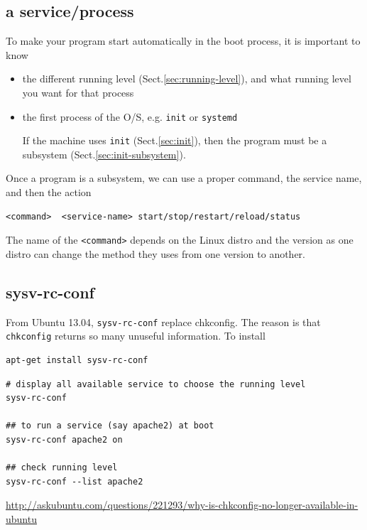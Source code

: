 \subsection{a service/process}
\label{sec:auto-run-service}

To make your program start automatically in the boot process, it is important to 
know
\begin{itemize}
  \item the different running level (Sect.\ref{sec:running-level}), and what
  running level you want for that process
  
  \item the first process of the O/S, e.g. \verb!init! or \verb!systemd!
  
  If the machine uses \verb!init! (Sect.\ref{sec:init}), then the program must
  be a subsystem (Sect.\ref{sec:init-subsystem}).
  
  
\end{itemize}


Once a program is a subsystem, we can use a proper command, the service name,
and then the action
\begin{verbatim}
<command>  <service-name> start/stop/restart/reload/status
\end{verbatim}
The name of the \verb!<command>! depends on the Linux distro and the version as
one distro can change the method they uses from one version to another.






\subsection{sysv-rc-conf}
\label{sec:sysv-rc-conf} 

From Ubuntu 13.04, \verb!sysv-rc-conf! replace chkconfig. The reason is that
\verb!chkconfig! returns so many unuseful information. To install
\begin{verbatim}
apt-get install sysv-rc-conf 
\end{verbatim}

\begin{verbatim}
# display all available service to choose the running level
sysv-rc-conf

## to run a service (say apache2) at boot
sysv-rc-conf apache2 on

## check running level
sysv-rc-conf --list apache2
\end{verbatim}
\url{http://askubuntu.com/questions/221293/why-is-chkconfig-no-longer-available-in-ubuntu}

